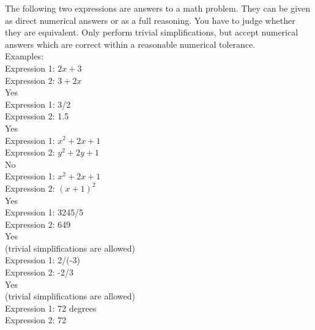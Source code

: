 \begin{tcolorbox}[
    colback=gray!10,
    colframe=black,
    arc=4pt,
    boxrule=1pt,
    title=\textbf{Evaluation Prompt (LLM-as-a-judge)},
    fonttitle=\bfseries,
    enhanced,
    left=4pt,
    right=4pt,
    top=4pt,
    bottom=4pt,
    breakable
]
The following two expressions are answers to a math problem. They can be given as direct numerical answers or as a full reasoning. You have to judge whether they are equivalent. Only perform trivial simplifications, but accept numerical answers which are correct within a reasonable numerical tolerance.\\

Examples:\\

    Expression 1: $2x+3$\\
    Expression 2: $3+2x$\\

Yes\\

    Expression 1: 3/2\\
    Expression 2: 1.5\\

Yes\\

    Expression 1: $x^2+2x+1$\\
    Expression 2: $y^2+2y+1$\\

No\\

    Expression 1: $x^2+2x+1$\\
    Expression 2: $(x+1)^2$\\

Yes\\

    Expression 1: 3245/5\\
    Expression 2: 649\\

Yes\\
(trivial simplifications are allowed)\\

    Expression 1: 2/(-3)\\
    Expression 2: -2/3\\

Yes\\
(trivial simplifications are allowed)\\

    Expression 1: 72 degrees\\
    Expression 2: 72\\


\end{tcolorbox}
